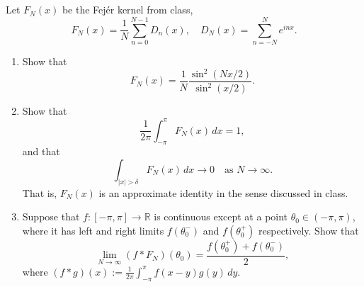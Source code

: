 \documentclass{article}
\theoremstyle{definition} %
\numberwithin{thm}{section} %
\theoremstyle{definition} %
\begin{document}
\section{}

Let $F_N(x)$ be the Fej\'er kernel from class,
\[
F_N(x) = \frac{1}{N} \sum_{n=0}^{N-1} D_n(x), \quad D_N(x) = \sum_{n=-N}^{N} e^{inx}.
\]
\begin{enumerate}[label=(\alph*)]
    \item Show that
\[
F_N(x) = \frac{1}{N} \frac{\sin^2(Nx/2)}{\sin^2(x/2)}.
\]

\item Show that
\[
\frac{1}{2\pi} \int_{-\pi}^{\pi} F_N(x) \,dx = 1,
\]
and that
\[
\int_{|x| > \delta} F_N(x) \,dx \to 0 \quad \text{as } N \to \infty.
\]
That is, $F_N(x)$ is an approximate identity in the sense discussed in class.

\item Suppose that $f: [-\pi, \pi] \to \mathbb{R}$ is continuous except at a point $\theta_0 \in (-\pi, \pi)$, where it has left and right limits $f(\theta_0^-)$ and $f(\theta_0^+)$ respectively. Show that
\[
\lim_{N \to \infty} (f * F_N)(\theta_0) = \frac{f(\theta_0^+) + f(\theta_0^-)}{2},
\]
where $(f * g)(x) := \frac{1}{2\pi} \int_{-\pi}^{\pi} f(x - y) g(y) \,dy$.
\end{enumerate}
\end{document}
